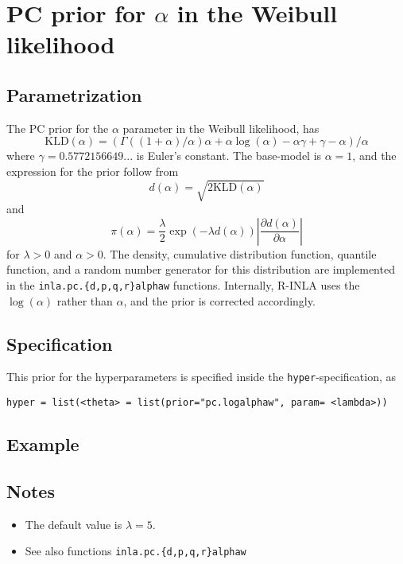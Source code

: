 \documentclass[a4paper,11pt]{article}
\begin{document}
\section*{PC prior for $\alpha$ in the Weibull likelihood}

\subsection*{Parametrization}
The PC prior for the $\alpha$ parameter in the Weibull likelihood, has
\begin{displaymath}
    \text{KLD}(\alpha) = (\Gamma((1 + \alpha)/\alpha)\alpha + \alpha \log(\alpha) - \alpha\gamma + \gamma - \alpha)/\alpha
\end{displaymath}
where $\gamma = 0.5772156649...$ is Euler's constant. The base-model is
$\alpha=1$, and the expression for the prior follow from
\begin{displaymath}
    d(\alpha) = \sqrt{2\text{KLD}(\alpha)}
\end{displaymath}
and
\begin{displaymath}
    \pi(\alpha) = \frac{\lambda}{2} \exp(-\lambda d(\alpha)) \left|\frac{\partial
    d(\alpha)}{\partial\alpha}\right|
\end{displaymath}
for $\lambda>0$ and $\alpha{} > 0$. The density, cumulative
distribution function, quantile function, and a random number
generator for this distribution are implemented in the
\texttt{inla.pc.\{d,p,q,r\}alphaw} functions. Internally, R-INLA uses
the $\log(\alpha)$ rather than $\alpha$, and the prior is corrected
accordingly.

\subsection*{Specification}
This prior for the hyperparameters is specified inside the
\texttt{hyper}-specification, as
\begin{center}
    \texttt{hyper = list(<theta> =
        list(prior="pc.logalphaw", param= <lambda>))}
\end{center}

\subsection*{Example}

\subsection*{Notes}

\begin{itemize}
\item The default value is $\lambda = 5$.
\item See also functions \texttt{inla.pc.\{d,p,q,r\}alphaw}
\end{itemize}
\end{document}
